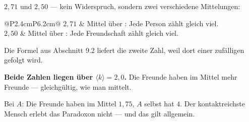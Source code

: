 \begin{aufgabe}
$2{,}71$ und $2{,}50$ --- kein Widerspruch, sondern zwei verschiedene Mittelungen:

\begin{center}
{\small
\renewcommand{\arraystretch}{1.5}
\begin{tabular}{@{}P{2.4cm}P{6.2cm}@{}}
\toprule
$2{,}71$ & Mittel über : Jede Person zählt gleich viel.\\
$2{,}50$ & Mittel über : Jede Freundschaft zählt gleich viel.\\
\bottomrule
\end{tabular}}
\end{center}

Die Formel aus Abschnitt 9.2 liefert die zweite Zahl, weil dort einer zufälligen  gefolgt wird.

\begin{center}
\begin{minipage}{0.9\textwidth}
\textbf{Beide Zahlen liegen über $\langle k\rangle = 2{,}0$.} Die Freunde haben im Mittel mehr Freunde --- gleichgültig, wie man mittelt.
\end{minipage}
\end{center}

 Bei $A$: Die Freunde haben im Mittel $1{,}75$, $A$ selbst hat $4$. Der kontaktreichste Mensch erlebt das Paradoxon nicht --- und das gilt allgemein.

\begin{center}
\begin{minipage}{0.86\textwidth}
\end{minipage}
\end{center}
\end{aufgabe}

